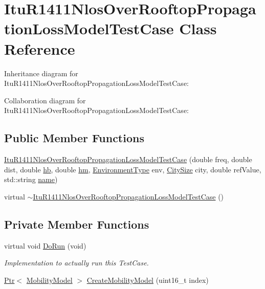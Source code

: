 \hypertarget{classItuR1411NlosOverRooftopPropagationLossModelTestCase}{}\section{Itu\+R1411\+Nlos\+Over\+Rooftop\+Propagation\+Loss\+Model\+Test\+Case Class Reference}
\label{classItuR1411NlosOverRooftopPropagationLossModelTestCase}


Inheritance diagram for Itu\+R1411\+Nlos\+Over\+Rooftop\+Propagation\+Loss\+Model\+Test\+Case\+:


Collaboration diagram for Itu\+R1411\+Nlos\+Over\+Rooftop\+Propagation\+Loss\+Model\+Test\+Case\+:
\subsection*{Public Member Functions}
\begin{DoxyCompactItemize}
\item 
\hyperlink{classItuR1411NlosOverRooftopPropagationLossModelTestCase_ab495d72c14e39c20ff7310ea47f79e69}{Itu\+R1411\+Nlos\+Over\+Rooftop\+Propagation\+Loss\+Model\+Test\+Case} (double freq, double dist, double \hyperlink{lte__pathloss_8m_a193c482b47dea4d7243e253acc8b2bee}{hb}, double \hyperlink{lte__pathloss_8m_adf48bfd0f3afa8972e753a0f895b0a51}{hm}, \hyperlink{group__propagation_ga0e392ed771a28c92112047e63308a53a}{Environment\+Type} env, \hyperlink{group__propagation_ga29c9a1b1a58b6a56054ff5ea4c5a574d}{City\+Size} city, double ref\+Value, std\+::string \hyperlink{generate__test__data__lte__spectrum__model_8m_ab74e6bf80237ddc4109968cedc58c151}{name})
\item 
virtual \hyperlink{classItuR1411NlosOverRooftopPropagationLossModelTestCase_a047091b4421b8a3ee0b209c418c3426d}{$\sim$\+Itu\+R1411\+Nlos\+Over\+Rooftop\+Propagation\+Loss\+Model\+Test\+Case} ()
\end{DoxyCompactItemize}
\subsection*{Private Member Functions}
\begin{DoxyCompactItemize}
\item 
virtual void \hyperlink{classItuR1411NlosOverRooftopPropagationLossModelTestCase_a8b0deec1405f06522fd9d3a44734e51d}{Do\+Run} (void)
\begin{DoxyCompactList}\small\item\em Implementation to actually run this Test\+Case. \end{DoxyCompactList}\item 
\hyperlink{classns3_1_1Ptr}{Ptr}$<$ \hyperlink{classns3_1_1MobilityModel}{Mobility\+Model} $>$ \hyperlink{classItuR1411NlosOverRooftopPropagationLossModelTestCase_afd90140a2c84e524eae45be4bbc4cc84}{Create\+Mobility\+Model} (uint16\+\_\+t index)
\end{DoxyCompactItemize}
